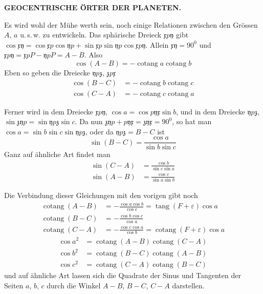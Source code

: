 \GaussVIGathering{}{13\textsuperscript{*}}
\par\clearpage
\thispagestyle{empty}
\noindent{}%
%
\parbox[t]{\dimexpr\linewidth-24mm\relax}{\centering\footnotesize\bfseries GEOCENTRISCHE ÖRTER DER PLANETEN.\par}%
\makebox[12mm][r]{}\par\nobreak\medskip
Es wird wohl der Mühe werth sein, noch einige Relationen zwischen
den Grössen $A$, $a$ u.\,s.\,w. zu entwickeln. Das sphärische Dreieck $\mathfrak{x}p\mathfrak{y}$
gibt $\cos\mathfrak{x}\mathfrak{y}=\cos\mathfrak{x}p\cos\mathfrak{y}p+\sin\mathfrak{x}p\sin\mathfrak{y}p\cos\mathfrak{x}p\mathfrak{y}$. Allein $\mathfrak{x}\mathfrak{y}=90^0$ und
$\mathfrak{x}p\mathfrak{y}=\mathfrak{x}pP-\mathfrak{y}pP=A-B$. Also
\[
\cos(A-B)=-\operatorname{cotang}a\operatorname{cotang}b
\]
Eben so geben die Dreiecke $\mathfrak{y}p\mathfrak{z}$, $\mathfrak{z}p\mathfrak{x}$
\[
\begin{aligned}
\cos(B-C)&=-\operatorname{cotang}b\operatorname{cotang}c\\
\cos(C-A)&=-\operatorname{cotang}c\operatorname{cotang}a
\end{aligned}
\]

Ferner wird in dem Dreiecke $\mathfrak{x}p\mathfrak{y}$, $\cos a=\cos p\mathfrak{y}\mathfrak{x}\sin b$, und in dem
Dreiecke $\mathfrak{y}p\mathfrak{z}$, $\sin\mathfrak{z}\mathfrak{y}p=\sin\mathfrak{y}p\mathfrak{z}\sin c$. Da nun $\mathfrak{z}\mathfrak{y}p+p\mathfrak{y}\mathfrak{x}=\mathfrak{z}\mathfrak{y}\mathfrak{x}=90^0$,
so hat man $\cos a=\sin b\sin c\sin\mathfrak{y}p\mathfrak{z}$, oder da $\mathfrak{y}p\mathfrak{z}=B-C$ ist
\[
\sin(B-C)=\frac{\cos a}{\sin b\sin c}
\]
Ganz auf ähnliche Art findet man
\[
\begin{aligned}
\sin(C-A)&=\frac{\cos b}{\sin c\sin a}\\
\sin(A-B)&=\frac{\cos c}{\sin a\sin b}
\end{aligned}
\]

Die Verbindung dieser Gleichungen mit den vorigen gibt noch
\[
\begin{aligned}
\operatorname{cotang}(A-B)&=-\frac{\cos a\cos b}{\cos c}=\operatorname{tang}(F+\varepsilon)\cos a\\
\operatorname{cotang}(B-C)&=-\frac{\cos b\cos c}{\cos a}\\
\operatorname{cotang}(C-A)&=-\frac{\cos c\cos a}{\cos b}=\operatorname{cotang}(F+\varepsilon)\cos a
\end{aligned}
\]
\[
\begin{aligned}
\cos a^2&=\operatorname{cotang}(A-B)\operatorname{cotang}(C-A)\\
\cos b^2&=\operatorname{cotang}(B-C)\operatorname{cotang}(A-B)\\
\cos c^2&=\operatorname{cotang}(C-A)\operatorname{cotang}(B-C)
\end{aligned}
\]
und auf ähnliche Art lassen sich die Quadrate der Sinus und Tangenten der Seiten
$a$, $b$, $c$ durch die Winkel $A-B$, $B-C$, $C-A$ darstellen.

